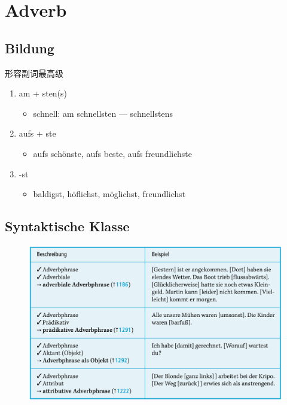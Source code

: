 \documentclass[UTF8]{report}
\begin{document}
\chapter{Adverb}
\section{Bildung}
形容副词最高级
\begin{enumerate}
    \item am + sten(s)
    \begin{itemize}
        \item schnell: am schnellsten — schnellstens
    \end{itemize}
    \item aufs + ste
    \begin{itemize}
        \item aufs schönste, aufs beste, aufs freundlichste
    \end{itemize}
    \item -st
    \begin{itemize}
        \item baldigst, höflichst, möglichst, freundlichst
    \end{itemize}
\end{enumerate}

\section{Syntaktische Klasse}

\begin{figure}[H]
    \centering
    \includegraphics[scale=0.5]{adv.png}
\end{figure}
\end{document}
